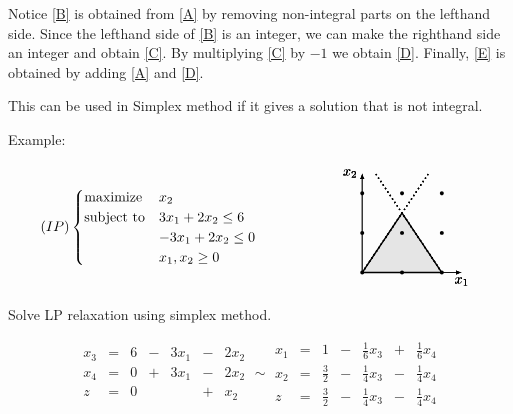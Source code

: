 \documentclass[11pt]{article}
\newcommand{\vc}[1]{\ensuremath{\vcenter{\hbox{#1}}}}
\begin{document}
Notice \eqref{B} is obtained from \eqref{A} by removing non-integral parts on the lefthand side. 
Since the lefthand side of \eqref{B} is an integer, we can make the righthand side
an integer and obtain \eqref{C}. By multiplying \eqref{C} by $-1$ we obtain \eqref{D}. 
Finally, \eqref{E} is obtained by adding \eqref{A} and \eqref{D}.


This can be used in Simplex method if it gives a solution that is not integral.

 
Example:

\[
(IP)
\begin{cases}
\text{maximize} & x_2 \\
\text{subject to} & 3x_1 + 2x_2 \leq 6 \\
                        & -3x_1 + 2x_2 \leq 0 \\
                        &     x_1,x_2 \geq 0
\end{cases}
\hskip 5em
\vc{
\tikzset{insep/.style={inner sep=1pt, outer sep=0pt, circle, fill},}
\begin{tikzpicture}[scale=1]
\draw[fill=gray!20, line width=1pt] (0,0) -- (2,0) -- (1,1.5)  -- cycle;
\foreach \x in {0,1,...,2}{
\foreach \y in {0,1,...,2}{
\draw (\x,\y) node[insep](x\x\y){};
}
\draw[-latex](0,0) -- (2.5,0) node[below]{$x_1$};
\draw[-latex](0,0) -- (0,2.5) node[left]{$x_2$};
\draw[dotted, line width=1pt]
(0,0) -- ++(56.3:3)
(2,0) -- ++(-56.3:-3)
;
}
\end{tikzpicture}
}
\]

Solve LP relaxation using simplex method.

\[
\begin{array}{ccccccc} 
x_3  &   =  &  6  &-&   3x_1 &-&   2x_2 \\
x_4  &   =  &  0  &+ & 3x_1 &-&   2x_2  \\
z   &   =     &  0  &  &          &+&   x_2 
\end{array}
\sim
\begin{array}{ccccccc} 
x_1  &   =  &  1  &-&   \frac{1}{6}x_3 &+&  \frac{1}{6}x_4 \\
x_2  &   =  &  \frac{3}{2}  &-& \frac14 x_3 &-&   \frac14 x_4  \\
z   &   =     &  \frac{3}{2}  &-  & \frac14 x_3 &-&   \frac14 x_4 
\end{array}
\]
\end{document}
